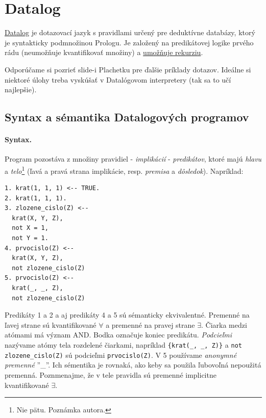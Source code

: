 \documentclass[10pt,a4paper]{article}
\begin{document}

\section{Datalog} 
\href{http://en.wikipedia.org/wiki/Datalog}{Datalog} je dotazovací jazyk s pravidlami určený pre deduktívne databázy, ktorý je syntakticky podmnožinou Prologu. Je založený na predikátovej logike prvého rádu (neumožňuje kvantifikovať množiny) a \underline{umožňuje rekurziu}. 

Odporúčame si pozrieť slide-i Plachetku pre ďalšie príklady dotazov.
Ideálne si niektoré úlohy treba vyskúšať v Datalógovom interpretery (tak sa to učí najlepšie).

\subsection{Syntax a sémantika Datalogových programov}

\paragraph{Syntax.}
Program pozostáva z množiny pravidiel - \emph{implikácií} - \emph{predikátov}, ktoré majú \emph{hlavu} a \emph{telo}\footnote{
Nie pätu. Poznámka autora. 
} (ľavá a pravá strana implikácie, resp. \emph{premisa} a \emph{dôsledok}). 
Napríklad:
\begin{verbatim}
1. krat(1, 1, 1) <-- TRUE.
2. krat(1, 1, 1).
3. zlozene_cislo(Z) <--
  krat(X, Y, Z),
  not X = 1,
  not Y = 1.
4. prvocislo(Z) <--
  krat(X, Y, Z),
  not zlozene_cislo(Z)
5. prvocislo(Z) <--
  krat(_, _, Z),
  not zlozene_cislo(Z)
\end{verbatim} 
Predikáty 1 a 2 a aj predikáty 4 a 5 sú sémanticky ekvivalentné. Premenné na ľavej strane sú kvantifikované $\forall$ a premenné na pravej strane $\exists$. Čiarka medzi atómami má význam AND. Bodka označuje koniec predikátu. \emph{Podcieľmi} nazývame atómy tela rozdelené čiarkami, napríklad 
  \verb|{krat(_, _, Z)}| a \verb|not zlozene_cislo(Z)| sú podcieľmi \verb|prvocislo(Z)|. 
V 5 používame \emph{anonymné premenné} ''\_''. Ich sémentika je rovnaká, ako keby sa použila ľubovoľná nepoužitá premenná. Poznmenajme, že v tele pravidla sú premenné implicitne kvantifikované $\exists$.
  
\end{document}
